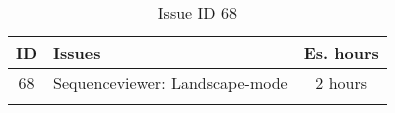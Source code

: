 \begin{longtable} { | c | p{12cm} | c | } 
\hline
	ID 	&	Issues	&		 Es. hours \\\hline
	 68	&	Sequenceviewer: Landscape-mode	&	2 hours \\\hline
\caption{Issue ID 68}
\label{tab:spr4_SVlandscape}
\end{longtable}